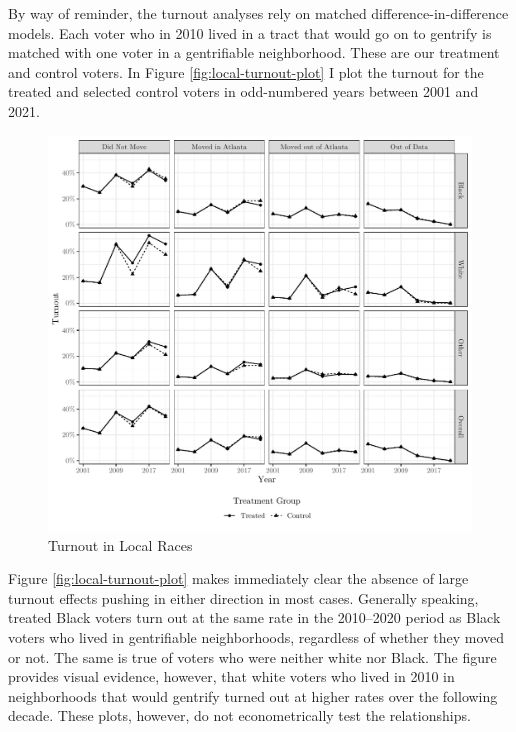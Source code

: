 \documentclass[
  12pt,
]{article}
\begin{document}
By way of reminder, the turnout analyses rely on matched difference-in-difference models. Each voter who in 2010 lived in a tract that would go on to gentrify is matched with one voter in a gentrifiable neighborhood. These are our treatment and control voters. In Figure \ref{fig:local-turnout-plot} I plot the turnout for the treated and selected control voters in odd-numbered years between 2001 and 2021.

\begin{figure}[H]

{\centering \includegraphics{gentrification_files/figure-latex/to-1-1} 

}

\caption{\label{fig:local-turnout-plot}Turnout in Local Races}\label{fig:to-1}
\end{figure}

Figure \ref{fig:local-turnout-plot} makes immediately clear the absence of large turnout effects pushing in either direction in most cases. Generally speaking, treated Black voters turn out at the same rate in the 2010--2020 period as Black voters who lived in gentrifiable neighborhoods, regardless of whether they moved or not. The same is true of voters who were neither white nor Black. The figure provides visual evidence, however, that white voters who lived in 2010 in neighborhoods that would gentrify turned out at higher rates over the following decade. These plots, however, do not econometrically test the relationships.
\end{document}

